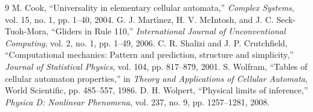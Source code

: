 \documentclass[11pt,a4paper]{article}
\theoremstyle{definition}
\theoremstyle{remark}
\begin{document}
\begin{thebibliography}{9}
 M. Cook, ``Universality in elementary cellular automata,'' \emph{Complex Systems}, vol. 15, no. 1, pp. 1--40, 2004.
 G. J. Mart\'{\i}nez, H. V. McIntosh, and J. C. Seck-Tuoh-Mora, ``Gliders in Rule 110,'' \emph{International Journal of Unconventional Computing}, vol. 2, no. 1, pp. 1--49, 2006.
 C. R. Shalizi and J. P. Crutchfield, ``Computational mechanics: Pattern and prediction, structure and simplicity,'' \emph{Journal of Statistical Physics}, vol. 104, pp. 817--879, 2001.
 S. Wolfram, ``Tables of cellular automaton properties,'' in \emph{Theory and Applications of Cellular Automata}, World Scientific, pp. 485--557, 1986.
 D. H. Wolpert, ``Physical limits of inference,'' \emph{Physica D: Nonlinear Phenomena}, vol. 237, no. 9, pp. 1257--1281, 2008.
\end{thebibliography}
\end{document}
